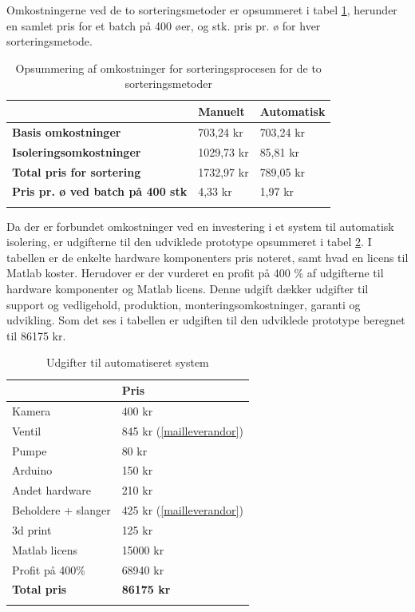 \newpage
Omkostningerne ved de to sorteringsmetoder er opsummeret i tabel \ref{tab:totalcost}, herunder en samlet pris for et batch på 400 øer, og stk. pris pr. ø for hver sorteringsmetode.
\begin{center}
		\begin{longtable}{ | m{8cm} | m{2.25cm} | m{2.25cm} | } 
			\hline
			 &\textbf{Manuelt} & \textbf{Automatisk} \\ 
			\hline
			 \textbf{Basis omkostninger} & 703,24 kr & 703,24 kr \\ 
			\hline
			 \textbf{Isoleringsomkostninger} & 1029,73 kr & 85,81 kr \\ 
			\hline
			\textbf{Total pris for sortering} & 1732,97 kr & 789,05 kr \\ 
			\hline
			\textbf{Pris pr. ø ved batch på 400 stk} & 4,33 kr & 1,97 kr \\ 
			\hline
			\caption{Opsummering af omkostninger for sorteringsprocesen for de to sorteringsmetoder}
			\label{tab:totalcost}
			 		\end{longtable}
\end{center}

Da der er forbundet omkostninger ved en investering i et system til automatisk isolering, er udgifterne til den udviklede prototype opsummeret i tabel \ref{tab:prototypecost}. I tabellen er de enkelte hardware komponenters pris noteret, samt hvad en licens til Matlab koster. Herudover er der vurderet en profit på 400 \% af udgifterne til hardware komponenter og Matlab licens. Denne udgift dækker udgifter til support og vedligehold, produktion, monteringsomkostninger, garanti og udvikling. Som det ses i tabellen er udgiften til den udviklede prototype beregnet til 86175 kr.
\begin{center}
		\begin{longtable}{ | m{9.5cm} | m{3.5cm} | } 
			\hline
			  & \textbf{Pris} \\ 
			\hline
			Kamera & 400 kr \citep{DH2}  \\ 
			\hline
			 Ventil  & 845 kr (\ref{mailleverandor})\\ 
			\hline
			Pumpe  & 80 kr \citep{DH8} \\ 
			\hline
			Arduino  & 150 kr \citep{DH3}\\ 
			\hline
			Andet hardware & 210 kr \\ 
			\hline
			Beholdere + slanger  & 425 kr (\ref{mailleverandor})\\ 
			\hline
			3d print & 125 kr \\ 
			\hline
			Matlab licens & 15000 kr \\
			\hline
			Profit på 400\% & 68940 kr \\	
			\hline
			\textbf{Total pris} & \textbf{86175 kr} \\		
			
			\hline
			\caption{Udgifter til automatiseret system}
			\label{tab:prototypecost}
			 		\end{longtable}
\end{center}


